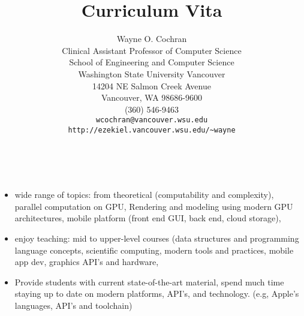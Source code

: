 \documentclass[10pt]{article}
\title{Curriculum Vita}
\author{Wayne O. Cochran\\
       Clinical Assistant Professor of Computer Science\\
       School of Engineering and Computer Science\\
       Washington State University Vancouver\\
       14204 NE Salmon Creek Avenue\\
       Vancouver, WA 98686-9600\\
       (360) 546-9463\\
       {\tt wcochran@vancouver.wsu.edu} \\
       {\tt http://ezekiel.vancouver.wsu.edu/\~{}wayne}}
\begin{document}
\maketitle




\\

\begin{itemize}
\item wide range of topics: from theoretical (computability and complexity), parallel computation on GPU, 
  Rendering and modeling using modern GPU architectures, mobile platform (front end GUI, back end,
  cloud storage),
\item  enjoy teaching: mid to upper-level courses (data structures and programming language concepts,
  scientific computing, 
  modern tools and practices, mobile app dev, graphics API's and hardware, 
\item Provide students with current state-of-the-art material, spend much time staying up to date
  on modern platforms, API's, and technology. (e.g, Apple's languages, API's and toolchain)
\end{itemize}
  
\vspace{0.5cm}
  
\end{document}
